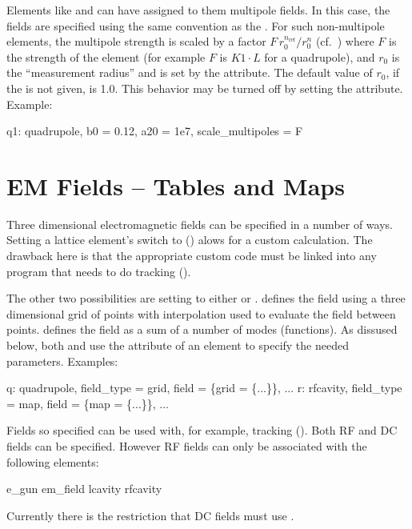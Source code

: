 Elements like  and  can have assigned
to them multipole fields. In this case, the fields are specified using
the same convention as the .
For such non-multipole elements, the multipole strength is scaled by a
factor $F \, r_0^{n_\text{ref}} / r_0^n$ (cf.~) where $F$ is
the strength of the element (for example $F$ is $K1 \cdot L$ for a
quadrupole), and $r_0$ is the ``measurement radius'' and is set by the
 attribute. The default value of $r_0$, if the 
is not given, is 1.0.  This behavior may be turned off by setting the
 attribute.  Example:
\begin{example}
  q1: quadrupole, b0 = 0.12, a20 = 1e7, scale_multipoles = F
\end{example}

\section{EM Fields -- Tables and Maps}
\label{s:em.fields}

Three dimensional electromagnetic fields can be specified in a number
of ways.  Setting a lattice element's  switch to
 () alows for a custom calculation. The
drawback here is that the appropriate custom code must be linked into
any program that needs to do tracking ().

The other two possibilities are setting  to either
 or .  defines the field using a three
dimensional grid of points with interpolation used to evaluate the
field between points.  defines the field as a sum of a number of
modes (functions). As dissused below, both  and  use the 
 attribute of an element to specify the needed parameters.
Examples:
\begin{example}
  q: quadrupole, field_type = grid, field = \{grid = \{...\}\}, ...
  r: rfcavity, field_type = map, field = \{map = \{...\}\}, ...
\end{example}
Fields so specified can be used with, for example, 
tracking (). Both RF and DC fields can be specified.
However RF fields can only be associated with the following elements:
\begin{example}
  e_gun
  em_field
  lcavity
  rfcavity
\end{example}
Currently there is the restriction that DC fields must use .

